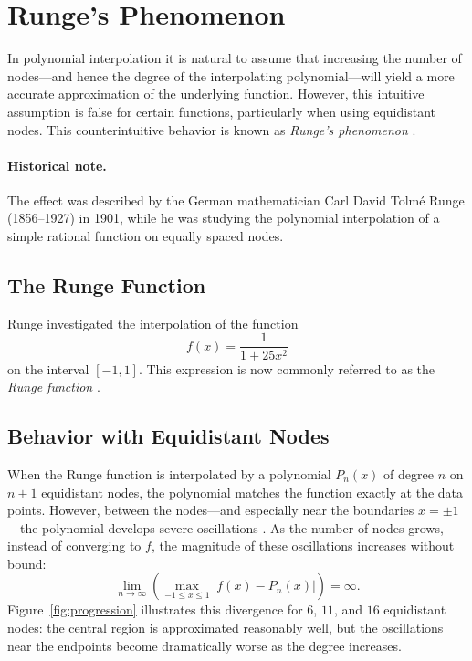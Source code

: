 \documentclass[12pt, a4paper]{article}
\theoremstyle{plain}
\theoremstyle{definition}
\theoremstyle{remark}
\begin{document}
\newpage
\section{Runge's Phenomenon}

In polynomial interpolation it is natural to assume that increasing the number of nodes---and hence the degree of the interpolating polynomial---will yield a more accurate approximation of the underlying function. However, this intuitive assumption is false for certain functions, particularly when using equidistant nodes. This counterintuitive behavior is known as \emph{Runge's phenomenon} \cite{runge}.

\paragraph{Historical note.} The effect was described by the German mathematician Carl David Tolm\'e Runge (1856--1927) in 1901, while he was studying the polynomial interpolation of a simple rational function on equally spaced nodes.

\subsection{The Runge Function}

Runge investigated the interpolation of the function
\begin{equation}\label{eq:runge}
    f(x) = \frac{1}{1 + 25x^2}
\end{equation}
on the interval $[-1, 1]$. This expression is now commonly referred to as the \emph{Runge function} \cite{runge}.

\subsection{Behavior with Equidistant Nodes}

When the Runge function is interpolated by a polynomial $P_n(x)$ of degree $n$ on $n+1$ equidistant nodes, the polynomial matches the function exactly at the data points. However, between the nodes---and especially near the boundaries $x = \pm 1$---the polynomial develops severe oscillations \cite{runge, knorrenschild}. As the number of nodes grows, instead of converging to $f$, the magnitude of these oscillations increases without bound:
\begin{equation}
    \lim_{n \to \infty} \left( \max_{-1 \le x \le 1} |f(x) - P_n(x)| \right) = \infty .
\end{equation}
Figure~\ref{fig:progression} illustrates this divergence for $6$, $11$, and $16$ equidistant nodes: the central region is approximated reasonably well, but the oscillations near the endpoints become dramatically worse as the degree increases.
\end{document}
